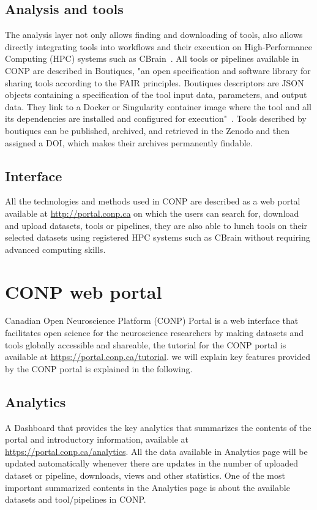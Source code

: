\subsection{Analysis and tools}
The analysis layer not only allows finding and downloading of tools, also allows directly integrating tools into workflows and their execution on High-Performance Computing (HPC) systems such as CBrain~\cite{}. All tools or pipelines available in CONP are described in Boutiques, "an open specification and software library for sharing tools according to the FAIR principles. Boutiques descriptors are JSON objects containing a specification of the tool input data, parameters, and output data. They link to a Docker or Singularity container image where the tool and all its dependencies are installed and configured for execution"~\cite{conppaper}. Tools described by boutiques  can be published, archived, and retrieved in the Zenodo and then assigned a DOI, which makes their archives permanently findable.

\subsection{Interface}
All the technologies and methods used in CONP are described as a web portal available at \url{http://portal.conp.ca} on which the users can search for, download and upload datasets, tools or pipelines, they are also able to lunch tools on their selected datasets using registered HPC systems such as CBrain without requiring advanced computing skills.  


 









\section{CONP web portal}

Canadian Open Neuroscience Platform (CONP) Portal is a web interface that facilitates open science for the neuroscience researchers by making datasets and tools globally accessible and shareable, the tutorial for the CONP portal is available at \url{https://portal.conp.ca/tutorial}. we will explain key features provided by the CONP portal is explained in the following. 

\subsection{Analytics}
A Dashboard that provides the key analytics that summarizes the  contents of the portal and introductory information, available at \url{https://portal.conp.ca/analytics}. All the data available in Analytics page will be updated automatically whenever there are updates in the number of uploaded dataset or pipeline, downloads, views and other statistics. One of the most important summarized contents in the Analytics page is about the available datasets and tool/pipelines in CONP.

